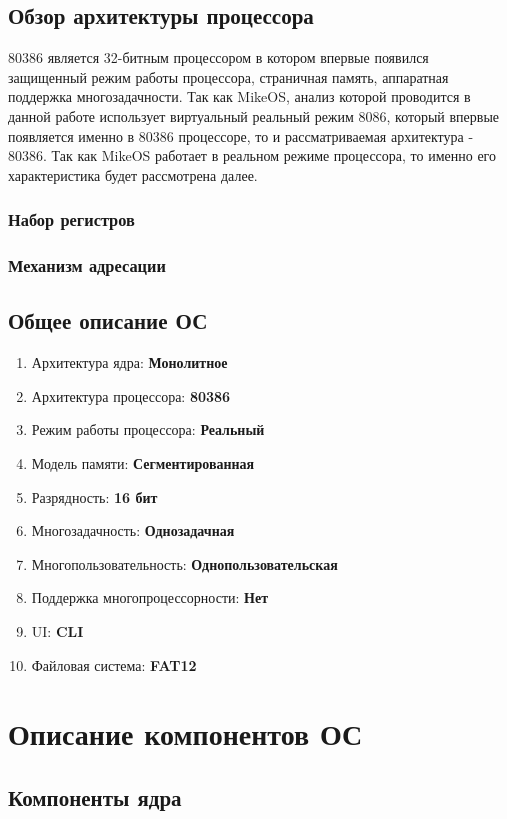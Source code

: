 \documentclass[12pt]{article}
\begin{document}
\subsection{Обзор архитектуры процессора}
	80386 является 32-битным процессором в котором впервые появился защищенный
режим работы процессора, страничная память, аппаратная поддержка
многозадачности. Так как MikeOS, анализ которой проводится в данной работе
использует виртуальный реальный режим 8086, который впервые появляется именно
в 80386 процессоре, то и рассматриваемая архитектура - 80386. Так как MikeOS
работает в реальном режиме процессора, то именно его характеристика будет
рассмотрена далее.
\subsubsection{Набор регистров}

\subsubsection{Механизм адресации}
	
\subsection{Общее описание ОС}
\begin{enumerate}[leftmargin=2\parindent]
	\item{Архитектура ядра: \textbf{Монолитное}}
	\item{Архитектура процессора: \textbf{80386}}
	\item{Режим работы процессора: \textbf{Реальный}}
	\item{Модель памяти: \textbf{Сегментированная}}
	\item{Разрядность: \textbf{16 бит}}
	\item{Многозадачность: \textbf{Однозадачная}}
	\item{Многопользовательность: \textbf{Однопользовательская}}
	\item{Поддержка многопроцессорности: \textbf{Нет}}
	\item{UI: \textbf{CLI}}
	\item{Файловая система: \textbf{FAT12}}
\end{enumerate}

\section{Описание компонентов ОС}
\subsection{Компоненты ядра}
 	
\end{document}
